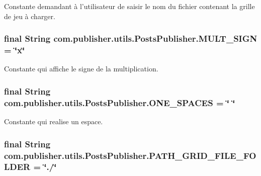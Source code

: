 Constante demandant à l'utilisateur de saisir le nom du fichier contenant la grille de jeu à charger. \hypertarget{interfacecom_1_1publisher_1_1utils_1_1PostsPublisher_aa93d20e80e4b59d18e23eb97357b5809}{
\subsubsection[{M\-U\-L\-T\-\_\-\-S\-I\-G\-N}]{\setlength{\rightskip}{0pt plus 5cm}final String com.\-publisher.\-utils.\-Posts\-Publisher.\-M\-U\-L\-T\-\_\-\-S\-I\-G\-N = \char`\"{}x\char`\"{}\hspace{0.3cm}{\ttfamily [static]}}}\label{interfacecom_1_1publisher_1_1utils_1_1PostsPublisher_aa93d20e80e4b59d18e23eb97357b5809}
Constante qui affiche le signe de la multiplication. \hypertarget{interfacecom_1_1publisher_1_1utils_1_1PostsPublisher_aa3a472920abb87cef8080be7b1c46888}{
\subsubsection[{O\-N\-E\-\_\-\-S\-P\-A\-C\-E\-S}]{\setlength{\rightskip}{0pt plus 5cm}final String com.\-publisher.\-utils.\-Posts\-Publisher.\-O\-N\-E\-\_\-\-S\-P\-A\-C\-E\-S = \char`\"{} \char`\"{}\hspace{0.3cm}{\ttfamily [static]}}}\label{interfacecom_1_1publisher_1_1utils_1_1PostsPublisher_aa3a472920abb87cef8080be7b1c46888}
Constante qui realise un espace. \hypertarget{interfacecom_1_1publisher_1_1utils_1_1PostsPublisher_a22251ae0d1faab17907daa8d346ddb21}{
\subsubsection[{P\-A\-T\-H\-\_\-\-G\-R\-I\-D\-\_\-\-F\-I\-L\-E\-\_\-\-F\-O\-L\-D\-E\-R}]{\setlength{\rightskip}{0pt plus 5cm}final String com.\-publisher.\-utils.\-Posts\-Publisher.\-P\-A\-T\-H\-\_\-\-G\-R\-I\-D\-\_\-\-F\-I\-L\-E\-\_\-\-F\-O\-L\-D\-E\-R = \char`\"{}./\char`\"{}\hspace{0.3cm}{\ttfamily [static]}}}\label{interfacecom_1_1publisher_1_1utils_1_1PostsPublisher_a22251ae0d1faab17907daa8d346ddb21}
